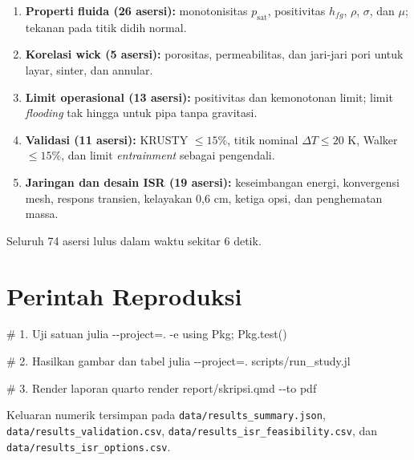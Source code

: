\documentclass[
  indonesian,
  12pt,
  a4paper,
]{report}
\newenvironment{Shaded}{\begin{snugshade}}{\end{snugshade}}
\newcommand{\AttributeTok}[1]{\textcolor[rgb]{0.40,0.45,0.13}{#1}}
\newcommand{\CommentTok}[1]{\textcolor[rgb]{0.37,0.37,0.37}{#1}}
\newcommand{\ExtensionTok}[1]{\textcolor[rgb]{0.00,0.23,0.31}{#1}}
\newcommand{\NormalTok}[1]{\textcolor[rgb]{0.00,0.23,0.31}{#1}}
\newcommand{\OperatorTok}[1]{\textcolor[rgb]{0.37,0.37,0.37}{#1}}
\newcommand{\StringTok}[1]{\textcolor[rgb]{0.13,0.47,0.30}{#1}}
\providecommand{\tightlist}{%
  \setlength{\itemsep}{0pt}\setlength{\parskip}{0pt}}
\begin{document}
\begin{enumerate}
\def\labelenumi{\arabic{enumi}.}
\tightlist
\item
  \textbf{Properti fluida (26 asersi):} monotonisitas
  \(p_{\mathrm{sat}}\), positivitas \(h_{fg}\), \(\rho\), \(\sigma\),
  dan \(\mu\); tekanan pada titik didih normal.
\item
  \textbf{Korelasi wick (5 asersi):} porositas, permeabilitas, dan
  jari-jari pori untuk layar, sinter, dan annular.
\item
  \textbf{Limit operasional (13 asersi):} positivitas dan kemonotonan
  limit; limit \emph{flooding} tak hingga untuk pipa tanpa gravitasi.
\item
  \textbf{Validasi (11 asersi):} KRUSTY \(\le15\%\), titik nominal
  \(\Delta T\le20\) K, Walker \(\le15\%\), dan limit \emph{entrainment}
  sebagai pengendali.
\item
  \textbf{Jaringan dan desain ISR (19 asersi):} keseimbangan energi,
  konvergensi mesh, respons transien, kelayakan 0,6 cm, ketiga opsi, dan
  penghematan massa.
\end{enumerate}

Seluruh 74 asersi lulus dalam waktu sekitar 6 detik.

\section{Perintah Reproduksi}\label{perintah-reproduksi}

\begin{Shaded}
\begin{Highlighting}[]
\CommentTok{\# 1. Uji satuan}
\ExtensionTok{julia} \AttributeTok{{-}{-}project}\OperatorTok{=}\NormalTok{. }\AttributeTok{{-}e} \StringTok{\textquotesingle{}using Pkg; Pkg.test()\textquotesingle{}}

\CommentTok{\# 2. Hasilkan gambar dan tabel}
\ExtensionTok{julia} \AttributeTok{{-}{-}project}\OperatorTok{=}\NormalTok{. scripts/run\_study.jl}

\CommentTok{\# 3. Render laporan}
\ExtensionTok{quarto}\NormalTok{ render report/skripsi.qmd }\AttributeTok{{-}{-}to}\NormalTok{ pdf}
\end{Highlighting}
\end{Shaded}

Keluaran numerik tersimpan pada \texttt{data/results\_summary.json},
\texttt{data/results\_validation.csv},
\texttt{data/results\_isr\_feasibility.csv}, dan
\texttt{data/results\_isr\_options.csv}.
\end{document}
